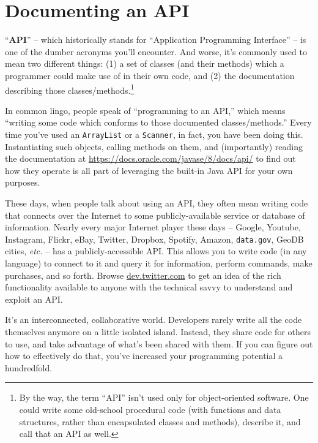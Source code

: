 

\chapter{Documenting an API}
\label{ch:api}

``\textbf{API}'' -- which historically stands for ``Application Programming
Interface'' -- is one of the dumber acronyms you'll encounter. And worse, it's
commonly used to mean two different things: (1) a set of classes (and their
methods) which a programmer could make use of in their own code, and (2) the
documentation describing those classes/methods.\footnote{By the way, the term
``API'' isn't used only for object-oriented software. One could write some
old-school procedural code (with functions and data structures, rather than
encapsulated classes and methods), describe it, and call that an API as well.}

In common lingo, people speak of ``programming to an API,'' which means
``writing some code which conforms to those documented classes/methods.'' Every
time you've used an \texttt{ArrayList} or a \texttt{Scanner}, in fact, you
have been doing this. Instantiating such objects, calling methods on them, and
(importantly) reading the documentation at
\url{https://docs.oracle.com/javase/8/docs/api/} to find out how they
operate is all part of leveraging the built-in Java API for your own purposes.

These days, when people talk about using an API, they often mean writing code
that connects over the Internet to some publicly-available service or database
of information. Nearly every major Internet player these days -- Google,
Youtube, Instagram, Flickr, eBay, Twitter, Dropbox, Spotify, Amazon,
\texttt{data.gov}, GeoDB cities, \textit{etc.} -- has a publicly-accessible
API. This allows you to write code (in any language) to connect to it and
query it for information, perform commands, make purchases, and so forth.
Browse \url{dev.twitter.com} to get an idea of the rich functionality
available to anyone with the technical savvy to understand and exploit an API.

It's an interconnected, collaborative world. Developers rarely write all the
code themselves anymore on a little isolated island. Instead, they share code
for others to use, and take advantage of what's been shared with them. If you
can figure out how to effectively do that, you've increased your programming
potential a hundredfold.

